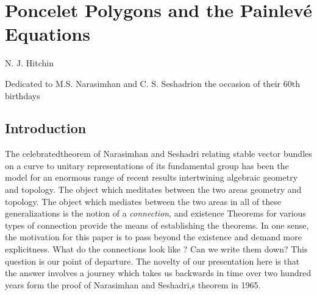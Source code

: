 \chapter{Poncelet Polygons and the Painlev\'e Equations}\label{chap7}


\begin{center}
N. J. Hitchin

\medskip
Dedicated to M.S. Narasimhan and C. S. Seshadri\break on the occasion of their 60th birthdays
\end{center}

\setcounter{pageoriginal}{150}
\section{Introduction}\label{chap7-sec-1}
The celebrated\pageoriginale theorem of Narasimhan and Seshadri \cite{chap7-key13} relating stable vector bundles on a curve to unitary representations of its fundamental group has been the model for an enormous range of recent results intertwining algebraic geometry and topology. The object which meditates between the two areas geometry and topology. The object which mediates between the two areas in all of these generalizations is the notion of a \textit{connection}, and existence Theorems for various types of connection provide the means of establishing the theorems. In one sense, the motivation for this paper is to pass beyond the existence and demand more explicitness. What do the connections look like ? Can we write them down? This question is our point of departure. The novelty of our presentation here is that the answer involves a journey which takes us backwards in time over two hundred years form the proof of Narasimhan and Seshadri,s theorem in 1965.

